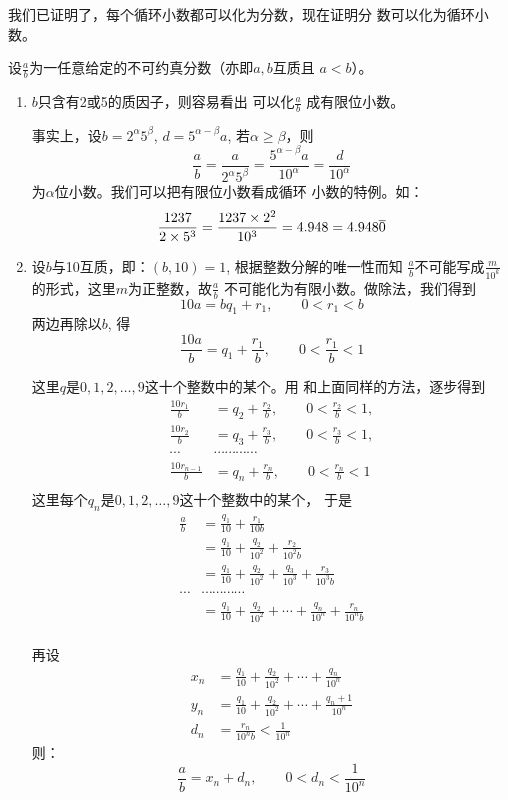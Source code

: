 我们已证明了，每个循环小数都可以化为分数，现在证明分
数可以化为循环小数。

设$\frac{a}{b}$为一任意给定的不可约真分数（亦即$a,b$互质且
$a<b$）。
\begin{enumerate}
    \item $b$只含有2或5的质因子，则容易看出
可以化$\frac{a}{b}$
成有限位小数。

事实上，设$b=2^{\alpha}5^{\beta}$, $d=5^{\alpha-\beta}a$, 若$\alpha\ge \beta$，则
$$\frac{a}{b}=\frac{a}{2^{\alpha}5^{\beta}}=\frac{5^{\alpha-\beta}a}{10^{\alpha}}=\frac{d}{10^{\alpha}}$$
为$\alpha$位小数。我们可以把有限位小数看成循环
小数的特例。如：
\[\dfrac{1237}{2\times 5^3}=\dfrac{1237\times 2^2}{10^3}=4.948=4.948\overline{0}\]

\item 设$b$与10互质，即：$(b,10)=1$, 根据整数分解的唯一性而知
$\frac{a}{b}$不可能写成$\frac{m}{10^k}$
的形式，这里$m$为正整数，故$\frac{a}{b}$
不可能化为有限小数。做除法，我们得到
\[10a=bq_1+r_1,\qquad 0<r_1<b\]
两边再除以$b$, 得
\[\frac{10a}{b}=q_1+\frac{r_1}{b},\qquad 0<\frac{r_1}{b}<1\]

这里$q$是$0,1,2,\ldots,9$这十个整数中的某个。用
和上面同样的方法，逐步得到
\[\begin{split}
    \frac{10r_1}{b}&=q_2+\frac{r_2}{b},\qquad 0<\frac{r_2}{b}<1,\\
    \frac{10r_2}{b}&=q_3+\frac{r_3}{b},\qquad 0<\frac{r_3}{b}<1,\\
\cdots &\cdots \cdots \cdots \cdots \\
    \frac{10r_{n-1}}{b}&=q_n+\frac{r_n}{b},\qquad 0<\frac{r_n}{b}<1\\
\end{split}\]
这里每个$q_n$是$0,1,2,\ldots,9$这十个整数中的某个，
于是
\[\begin{split}
    \frac{a}{b}&=\frac{q_1}{10}+\frac{r_1}{10b}\\
    &=\frac{q_1}{10}+\frac{q_2}{10^2}+\frac{r_2}{10^2b}\\
    &=\frac{q_1}{10}+\frac{q_2}{10^2}+\frac{q_3}{10^3}+\frac{r_3}{10^3b}\\
    \cdots &\cdots \cdots \cdots \cdots \\
    &=\frac{q_1}{10}+\frac{q_2}{10^2}+\cdots+\frac{q_n}{10^n}+\frac{r_n}{10^n b}\\
\end{split}\]

再设
\[\begin{split}
    x_n&=\frac{q_1}{10}+\frac{q_2}{10^2}+\cdots+\frac{q_n}{10^n}\\
    y_n&=\frac{q_1}{10}+\frac{q_2}{10^2}+\cdots+\frac{q_n+1}{10^n}\\
    d_n&=\frac{r_n}{10^n b}<\frac{1}{10^n}
\end{split}\]
则：
\[\frac{a}{b}=x_n+d_n,\qquad 0<d_n<\frac{1}{10^n}\]


\end{enumerate}
